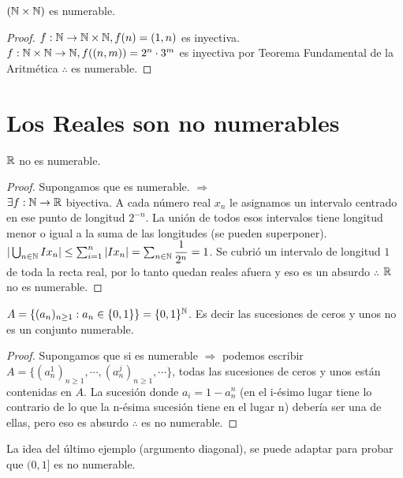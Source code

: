 \begin{eg}
    $(\mathbb{N} \times \mathbb{N})$ es numerable. 
    \begin{proof}
        $f: \mathbb{N} \to \mathbb{N}\times \mathbb{N}, f(n)=(1, n)$ es inyectiva.
        $f: \mathbb{N}\times \mathbb{N} \to \mathbb{N} , f((n, m))= 2^n \cdot 3^m$ es inyectiva por Teorema Fundamental de la Aritmética $\therefore$ es numerable. 
    \end{proof}
\end{eg}

\section{Los Reales son no numerables}

\begin{theorem}
    $\mathbb{R}$  no es numerable.
    \begin{proof}
        Supongamos que es numerable. $\Rightarrow$ \\
        $\exists f: \mathbb{N} \to \mathbb{R}$ biyectiva. A cada número real $x_n$ le asignamos un intervalo centrado en ese punto de longitud $2^{-n}$. La unión de todos esos intervalos tiene longitud menor o igual a la suma de las longitudes (se pueden superponer). \\
        
        $|\bigcup_{n\in\mathbb{N}} Ix_n| \leq \sum_{i=1}^{n} |Ix_n| = \sum_{n \in \mathbb{N}}\dfrac{1}{2^n} = 1 $. Se cubrió un intervalo de longitud $1$ de toda la recta real, por lo tanto quedan reales afuera y eso es un absurdo $\therefore$ $\mathbb{R}$ no es numerable.
    \end{proof}
\end{theorem}

\begin{eg}
    $A = \{ (a_n)_{n \geq 1} : a_n \in \{0, 1\}\} = \{0, 1\}^{\mathbb{N}}$. Es decir las sucesiones de ceros y unos no es un conjunto numerable.
    \begin{proof}
        Supongamos que si es numerable $\Rightarrow$ podemos escribir \\ $A = \{ (a_n^1)_{n\geq1}, \cdots, (a_n^j)_{n\geq1}, \cdots \}$, todas las sucesiones de ceros y unos están contenidas en $A$. La sucesión donde $a_i=1-a_n^n$ (en el i-ésimo lugar tiene lo contrario de lo que la n-ésima sucesión tiene en el lugar n) debería ser una de ellas, pero eso es absurdo $\therefore$ es no numerable.
    \end{proof}
\end{eg}

La idea del último ejemplo (argumento diagonal), se puede adaptar para probar que $(0, 1]$ es no numerable.

